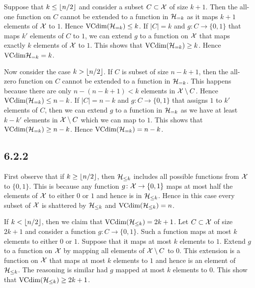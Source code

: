 Suppose that $k \leq \left \lfloor n / 2 \right \rfloor$ and consider a subset $C \subset \mathcal{X}$
of size $k + 1$. Then the all-one function on $C$ cannot be
extended to a function in $\mathcal{H}_{= k}$ as it maps $k + 1$ elements
of $\mathcal{X}$ to $1$. Hence $\text{VCdim}(\mathcal{H}_{= k}) \leq k$. If $|C| = k$
and $g \colon C \rightarrow \{0, 1\}$ that maps $k'$ elements of $C$ to $1$,
we can extend $g$ to a function on $\mathcal{X}$ that maps exactly $k$ elements of
$\mathcal{X}$ to $1$.  This shows that $\text{VCdim}(\mathcal{H}_{= k}) \geq k$. Hence
$\text{VCdim}{\ensuremath{\mathcal{H}}_{= k}} = k$.

Now consider the case $k > \left \lfloor n / 2 \right \rfloor$. If $C$ is subset of size
$n - k + 1$, then the all-zero function on $C$ cannot be extended
to a function in $\mathcal{H}_{= k}$. This happens because there are only
$n - (n - k + 1) < k$ elements in $\mathcal{X} \setminus C$. Hence
$\text{VCdim}(\mathcal{H}_{= k}) \leq n - k$. If $|C| = n - k$ and
$g \colon C \rightarrow \{0, 1\}$ that assigns $1$ to $k'$
elements of $C$, then we can extend $g$ to a function in
$\mathcal{H}_{= k}$ as we have at least $k - k'$ elements in
$\mathcal{X} \setminus C$ which we can map to $1$. This shows that
$\text{VCdim}(\mathcal{H}_{= k}) \geq n - k$. Hence
$\text{VCdim}(\mathcal{H}_{= k}) = n - k$.

\subsection*{6.2.2}

First observe that if $k \geq \left \lfloor n / 2 \right \rfloor$, then $\mathcal{H}_{\leq k}$ includes
all possible functions from $\mathcal{X}$ to $\{0, 1\}$. This is because any function
$g \colon \mathcal{X} \rightarrow \{0, 1\}$ maps at most half the elements of
$\mathcal{X}$ to either $0$ or $1$ and hence is in $\mathcal{H}_{\leq k}$.
Hence in this case every subset of $\mathcal{X}$ is shattered by $\mathcal{H}_{\leq k}$
and $\text{VCdim} (\mathcal{H}_{\leq k}) = n$.

If $k < \left \lfloor n / 2 \right \rfloor$, then we claim that  $\text{VCdim} (\mathcal{H}_{\leq k}) = 2k + 1$.
Let $C \subset \mathcal{X}$ of size $2k + 1$ and consider a function
$g \colon C \rightarrow \{0, 1\}$. Such a function maps at most $k$ elements
to either $0$ or $1$. Suppose that it maps at most $k$ elements to $1$. Extend
$g$ to a function on $\mathcal{X}$ by mapping all elements of $\mathcal{X} \setminus C$ to $0$.
This extension is a function on $\mathcal{X}$ that maps at most $k$ elements to $1$
and hence is an element of $\mathcal{H}_{\leq k}$. The reasoning is similar had $g$
mapped at most $k$ elements to $0$. This show that
$\text{VCdim}(\mathcal{H}_{\leq k}) \geq 2k + 1$.

